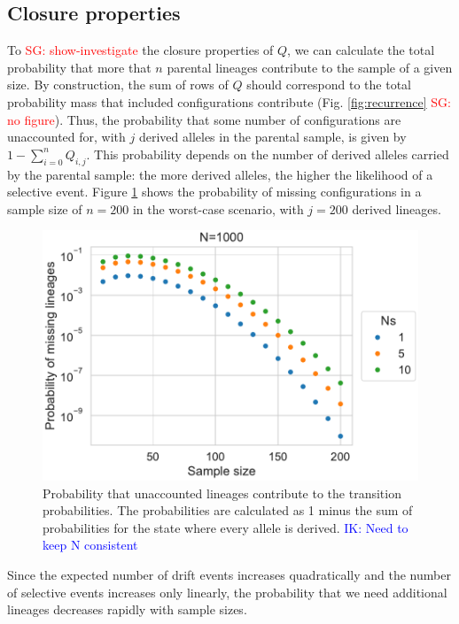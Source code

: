 \documentclass[review]{elsarticle}
\newcommand{\sgcomment}[1]{\textcolor{red}{SG: #1}}
\newcommand{\ikcomment}[1]{\textcolor{blue}{IK: #1}}
\begin{document}
\subsection{Closure properties}
\label{subsec:closure}

To \sgcomment{show-investigate} the closure properties of $Q$, we can calculate the total
probability that more that $n$ parental lineages contribute to the sample of a given size. By
construction, the sum of rows of $Q$ should correspond to the total probability mass that included
configurations contribute (Fig. \ref{fig:recurrence} \sgcomment{no figure}). Thus, the probability
that some number of configurations are unaccounted for, with $j$ derived alleles in the parental
sample, is given by $1-\sum_{i=0}^{n}Q_{i,j}$. This probability depends on the number of derived
alleles carried by the parental sample: the more derived alleles, the higher the likelihood of a
selective event. Figure \ref{fig:missing} shows the probability of missing configurations in a
sample size of $n=200$ in the worst-case scenario, with $j=200$ derived lineages.

\begin{figure}
  \centering
  \includegraphics[]{fig/missing.pdf}
  \caption{Probability that unaccounted lineages contribute to the transition probabilities. The
    probabilities are calculated as 1 minus the sum of probabilities for the state where every
    allele is derived. \ikcomment{Need to keep N consistent}}
  \label{fig:missing}
\end{figure}

Since the expected number of drift events increases quadratically and the number of selective events
increases only linearly, the probability that we need additional lineages decreases rapidly with
sample sizes.
\end{document}
